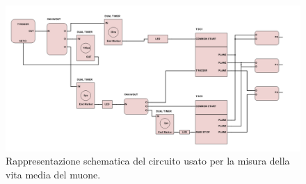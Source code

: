 \documentclass{standalone}
\begin{document}
\begin{figure}[H]
		\includegraphics[width=1.2\textwidth]{./SCHEMI/FINAL.png} %
    \caption{\small Rappresentazione schematica del circuito usato per la misura della vita media del muone.}
		\label{fig:circ-acquisizione}

\end{figure}
\end{document}
